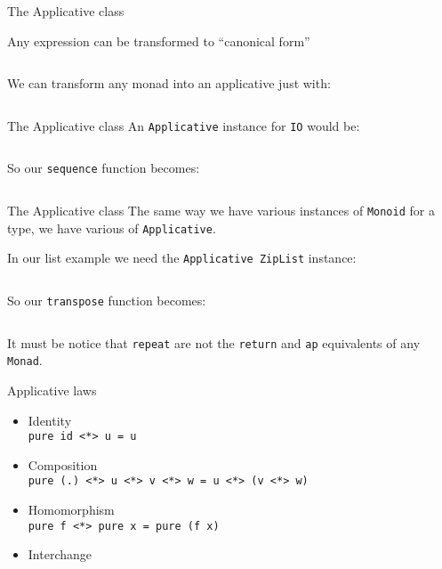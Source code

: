 \documentclass[10pt]{beamer}
\begin{document}
\begin{frame}{The Applicative class}

  Any expression can be transformed to ``canonical form''

  \inputminted{text}{../src/canonical.txt}

  We can transform any monad into an applicative just with:

  \inputminted{haskell}{../src/to_monad.hs}
\end{frame}

\begin{frame}{The Applicative class}
  An \verb~Applicative~ instance for \verb~IO~ would be:

  \inputminted{haskell}{../src/io_instance.hs}

  So our \verb~sequence~ function becomes:

  \inputminted{haskell}{../src/sequence_ap.hs}
\end{frame}

\begin{frame}{The Applicative class}
  The same way we have various instances of \verb~Monoid~ for a type,
  we have various of \verb~Applicative~.

  In our list example we need the \verb~Applicative ZipList~ instance:

  \inputminted{haskell}{../src/ListInstance.hs}

  So our \verb~transpose~ function becomes:

  \inputminted{haskell}{../src/transpose_ap.hs}

  It must be notice that \verb~repeat~ are not the \verb~return~ and
  \verb~ap~ equivalents of any \verb~Monad~.

\end{frame}

\begin{frame}{Applicative laws}
  \begin{itemize}
  \item Identity\\
    \verb~pure id <*> u = u~
  \item Composition\\
    \verb~pure (.) <*> u <*> v <*> w = u <*> (v <*> w)~
  \item Homomorphism\\
    \verb~pure f <*> pure x = pure (f x)~
  \item Interchange
  \end{itemize}
\end{frame}
\end{document}
